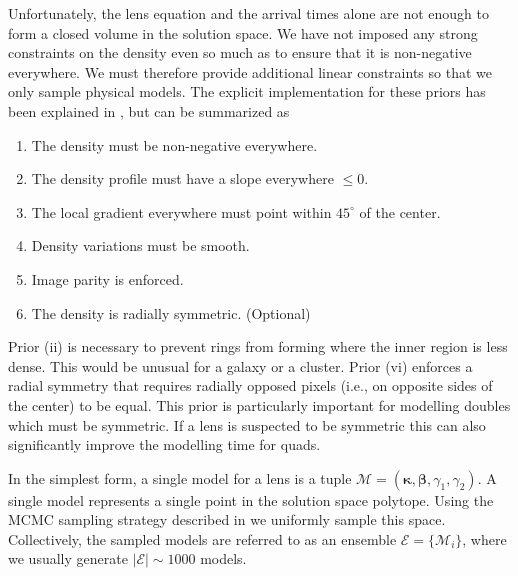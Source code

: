 \documentclass[galley,usenatbib]{mn2e}
\newcommand{\M}{\ensuremath{\mathscr{M}}}
\newcommand{\E}{\ensuremath{\mathscr{E}}}
\renewcommand{\vec}[1]{\ensuremath{\boldsymbol{#1}}}
\begin{document}
Unfortunately, the lens equation and the arrival times alone are not enough to form a
closed volume in the solution space. We have not imposed any strong constraints
on the density even so much as to ensure that it is non-negative everywhere. We
must therefore provide additional linear constraints so that we only sample
physical models. The explicit implementation for these priors has been
explained in \cite{2008ApJ...679...17C}, but can be summarized as
\begin{enumerate}
\item The density must be non-negative everywhere.
\item The density profile must have a slope everywhere $\le 0$.
\item The local gradient everywhere must point within $45^{\circ}$ of the center.
\item Density variations must be smooth.
\item Image parity is enforced.
\item The density is radially symmetric. (Optional)
\end{enumerate}

Prior (ii) is necessary to prevent rings from forming where the inner region is
less dense. This would be unusual for a galaxy or a cluster. Prior (vi)
enforces a radial symmetry that requires radially opposed pixels (i.e., on
opposite sides of the center) to be equal. This prior is particularly important
for modelling doubles which must be symmetric. If a lens is suspected to be
symmetric this can also significantly improve the modelling time for quads.

In the simplest form, a single model for a lens is a tuple $\M = (\vec\kappa,
\vec\beta, \gamma_1, \gamma_2)$. A single model represents a single point in the
solution space polytope. Using the MCMC sampling strategy described in \cite{2012MNRAS.425.3077L}
we uniformly sample this space. Collectively, the sampled models are referred
to as an ensemble $\E = \{\M_i\}$, where we usually generate $|\E| \sim 1000$ models.
\end{document}

